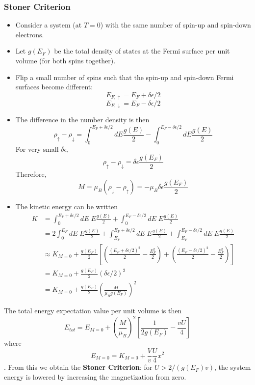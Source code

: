 \documentclass[10pt]{article}
\begin{document}
\subsubsection{Stoner Criterion}
\begin{itemize}
\item Consider a system (at $T = 0$) with the same number of spin-up and spin-down electrons.
\item Let $g(E_{F})$ be the total density of states at the Fermi surface per unit volume (for both spins together).
\item Flip a small number of spins such that the spin-up and spin-down Fermi surfaces become different:
$$ E_{F,\uparrow} = E_{F} + \delta\epsilon/2$$
$$ E_{F,\downarrow} = E_{F} - \delta\epsilon/2$$
\item The difference in the number density is then
$$
  \rho_{\uparrow} - \rho_{\downarrow} = \int_{0}^{E_{F} + \delta\epsilon/2} dE \frac{g(E)}{2}  - \int_{0}^{E_{F} - \delta\epsilon/2} dE \frac{g(E)}{2}
$$
For very small $\delta\epsilon$,
$$
\rho_{\uparrow} - \rho_{\downarrow} = \delta \epsilon \frac{g(E_{F})}{2}
$$
Therefore,
$$
  M = \mu_{B}(\rho_{\downarrow} - \rho_{\uparrow}) = -\mu_{B}\delta \epsilon \frac{g(E_{F})}{2}
$$
\item The kinetic energy can be written
\begin{equation}
\begin{aligned}
K & = \int_{0}^{E_{F} + \delta \epsilon/2} dE\; E \frac{g(E)}{2} + \int_{0}^{E_{F} - \delta \epsilon/2} dE \;E \frac{g(E)}{2} \\
& = 2 \int_{0}^{E_{F}} dE \; E\frac{g(E)}{2} + \int_{E_{F}}^{E_{F} + \delta \epsilon/2} dE\; E \frac{g(E)}{2} + \int_{E_{F}}^{E_{F} - \delta \epsilon/2} dE \;E \frac{g(E)}{2} \\
& \approx K_{M=0} + \frac{g(E_{F})}{2}\left [ \left ( \frac{(E_{F} + \delta \epsilon/2)^{2}}{2} - \frac{E_{F}^{2}}{2}\right) + \left ( \frac{(E_{F} - \delta \epsilon/2)^{2}}{2} - \frac{E_{F}^{2}}{2}\right)\right] \\
& = K_{M=0} + \frac{g(E_{F})}{2}(\delta \epsilon/2)^{2} \\
& = K_{M=0} + \frac{g(E_{F})}{2}\left (\frac{M}{\mu_{B}g(E_{F})}\right)^{2}
\end{aligned}
\end{equation}
\end{itemize}
The total energy expectation value per unit volume is then
$$
E_{tot} = E_{M=0} + \left ( \frac{M}{\mu_{B}}\right)^{2}\left [ \frac{1}{2g(E_{F})} - \frac{vU}{4}\right]
$$
where $$E_{M=0} = K_{M=0} + \frac{V}{v}\frac{U}{4}x^{2}$$. From this we obtain the \textbf{Stoner Criterion}: for $U > 2/(g(E_{F})v)$, the
system energy is lowered by increasing the magnetization from zero.
\end{document}
